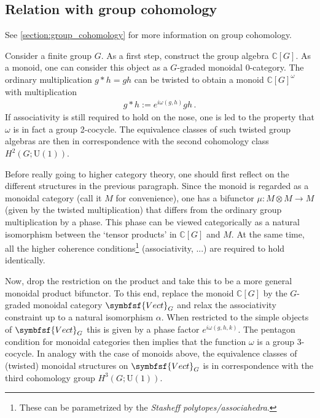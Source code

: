 \subsection{Relation with group cohomology}\label{section:hda_group_cohomology}

    See \cref{section:group_cohomology} for more information on group cohomology.

    Consider a finite group $G$. As a first step, construct the group algebra $\mathbb{C}[G]$. As a monoid, one can consider this object as a $G$-graded monoidal 0-category. The ordinary multiplication $g\ast h=gh$ can be twisted to obtain a monoid $\mathbb{C}[G]^\omega$ with multiplication
    \begin{gather}
        g\ast h := e^{i\omega(g,h)}gh\,.
    \end{gather}
    If associativity is still required to hold on the nose, one is led to the property that $\omega$ is in fact a group 2-cocycle. The equivalence classes of such twisted group algebras are then in correspondence with the second cohomology class $H^2(G;\mathrm{U}(1))$.

    Before really going to higher category theory, one should first reflect on the different structures in the previous paragraph. Since the monoid is regarded as a monoidal category (call it $M$ for convenience), one has a bifunctor $\mu:M\otimes M\rightarrow M$ (given by the twisted multiplication) that differs from the ordinary group multiplication by a phase. This phase can be viewed categorically as a natural isomorphism between the `tensor products' in $\mathbb{C}[G]$ and $M$. At the same time, all the higher coherence conditions\footnote{These can be parametrized by the \textit{Stasheff polytopes/associahedra}.} (associativity, ...) are required to hold identically.

    Now, drop the restriction on the product and take this to be a more general monoidal product bifunctor. To this end, replace the monoid $\mathbb{C}[G]$ by the $G$-graded monoidal category $\symbfsf{Vect}_G$ and relax the associativity constraint up to a natural isomorphism $\alpha$. When restricted to the simple objects of $\symbfsf{Vect}_G$ this is given by a phase factor $e^{i\omega(g,h,k)}$. The pentagon condition for monoidal categories then implies that the function $\omega$ is a group 3-cocycle. In analogy with the case of monoids above, the equivalence classes of (twisted) monoidal structures on $\symbfsf{Vect}_G$ is in correspondence with the third cohomology group $H^3(G;\mathrm{U}(1))$.

